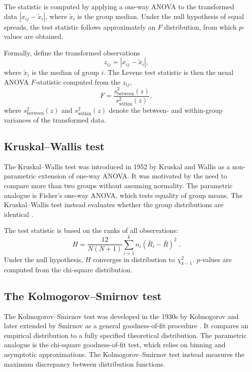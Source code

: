 \medskip

The statistic is computed by applying a one-way ANOVA to the transformed data \(|x_{ij} - \tilde{x}_i|\), where \(\tilde{x}_i\) is the group median. Under the null hypothesis of equal spreads, the test statistic follows approximately an \(F\) distribution, from which \(p\)-values are obtained.

\medskip

Formally, define the transformed observations
\[
    z_{ij} = |x_{ij} - \tilde{x}_i|,
\]
where \(\tilde{x}_i\) is the median of group \(i\). The Levene test statistic is then the usual ANOVA \(F\)-statistic computed from the \(z_{ij}\),
\[
    F
    =
    \frac{s_{\text{between}}^2(z)}{s_{\text{within}}^2(z)},
\]
where \(s_{\text{between}}^2(z)\) and \(s_{\text{within}}^2(z)\) denote the between- and within-group variances of the transformed data.

\subsection{Kruskal--Wallis test}

The Kruskal--Wallis test was introduced in 1952 by Kruskal and Wallis as a non-parametric extension of one-way ANOVA.  It was motivated by the need to compare more than two groups without assuming normality. The parametric analogue is Fisher’s one-way ANOVA, which tests equality of group
means. The Kruskal--Wallis test instead evaluates whether the group distributions are identical \cite{kruskal_wallis_1952_use}.

\medskip

The test statistic is based on the ranks of all observations:
\[
    H = \frac{12}{N(N+1)} \sum_{i=1}^k n_i (\bar R_i - \bar R)^2 \; .
\]
Under the null hypothesis, \(H\) converges in distribution to \(\chi^2_{k-1}\). \(p\)-values are computed from the chi-square distribution.

\subsection{The Kolmogorov--Smirnov test}

The Kolmogorov--Smirnov test was developed in the 1930s by Kolmogorov and later extended by Smirnov as a general goodness-of-fit procedure \cite{kolmogorov_1933_sulla,smirnov_1948_table}. It compares an empirical distribution to a fully specified theoretical distribution. The parametric analogue is the chi-square goodness-of-fit test, which relies on binning and asymptotic approximations. The Kolmogorov--Smirnov test instead measures the maximum discrepancy between distribution functions.

